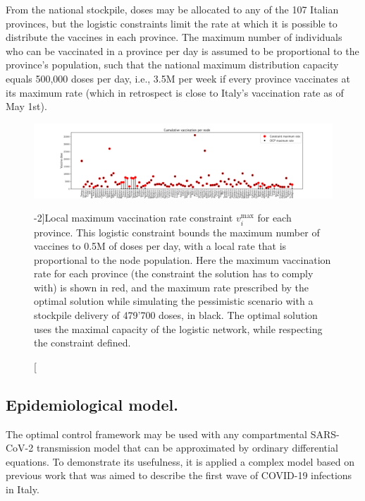 From the national stockpile, doses may be allocated to any of the 107 Italian provinces, but the logistic constraints limit the rate at which it is possible to distribute the vaccines in each province. The maximum number of individuals who can be vaccinated in a province per day is assumed to be proportional to the province's population, such that the national maximum distribution capacity equals 500,000 doses per day, i.e., 3.5M per week if every province vaccinates at its maximum rate (which in retrospect is close to Italy's vaccination rate as of May 1st). 

\begin{figure}[!ht]
    \centering
    \includegraphics{fig_italy-ocp/figuresSI/SI_constraint_dist.pdf}
    \caption[Vizualisation of the local maximum vaccination rate constraint][-2\baselineskip]{Local maximum vaccination rate constraint $v_i^\mathrm{max}$ for each province. This logistic constraint bounds the maximum number of vaccines to 0.5M of doses per day, with a local rate that is proportional to the node population. Here the maximum vaccination rate for each province (the constraint the solution has to comply with) is shown in red, and the maximum rate prescribed by the optimal solution while simulating the pessimistic scenario with a stockpile delivery of 479'700 doses, in black. The optimal solution uses the maximal capacity of the logistic network, while respecting the constraint defined.}
    \label{fig:OC_logistic_constraints}
\end{figure}


\subsection{Epidemiological model.} 
The optimal control framework may be used with any compartmental SARS-CoV-2 transmission model that can be approximated by ordinary differential equations. To demonstrate its usefulness, it is applied a complex model based on previous work that was aimed to describe the first wave of COVID-19 infections in Italy\parencite{Gatto:SpreadDynamicsCOVID19:2020,Bertuzzo:GeographyCOVID19Spread:2020}. 

